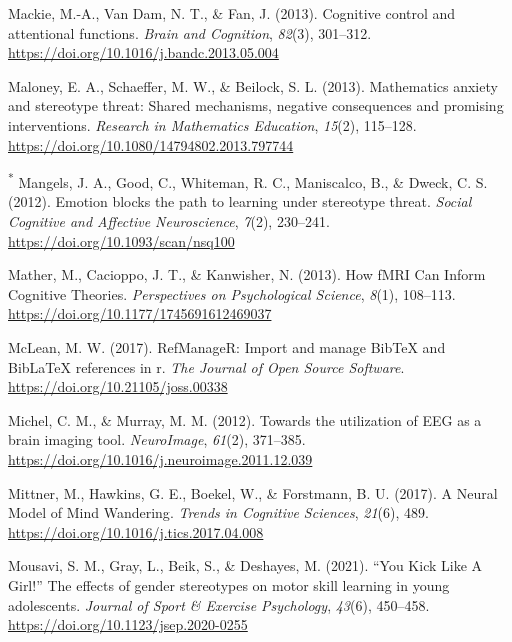 \documentclass[
  stu, a4paper,floatsintext]{apa7}
\newlength{\cslhangindent}
\newenvironment{CSLReferences}[2] %
 {\begin{list}{}{%
  \setlength{\itemindent}{0pt}
  \setlength{\leftmargin}{0pt}
  \setlength{\parsep}{0pt}
  \ifodd #1
   \setlength{\leftmargin}{\cslhangindent}
   \setlength{\itemindent}{-1\cslhangindent}
  \fi
  \setlength{\itemsep}{#2\baselineskip}}}
 {\end{list}}
\begin{document}
\begin{CSLReferences}{1}{0}
Mackie, M.-A., Van Dam, N. T., \& Fan, J. (2013). Cognitive control and attentional functions. \emph{Brain and Cognition}, \emph{82}(3), 301--312. \url{https://doi.org/10.1016/j.bandc.2013.05.004}

Maloney, E. A., Schaeffer, M. W., \& Beilock, S. L. (2013). Mathematics anxiety and stereotype threat: Shared mechanisms, negative consequences and promising interventions. \emph{Research in Mathematics Education}, \emph{15}(2), 115--128. \url{https://doi.org/10.1080/14794802.2013.797744}

\textsuperscript{*} Mangels, J. A., Good, C., Whiteman, R. C., Maniscalco, B., \& Dweck, C. S. (2012). Emotion blocks the path to learning under stereotype threat. \emph{Social Cognitive and Affective Neuroscience}, \emph{7}(2), 230--241. \url{https://doi.org/10.1093/scan/nsq100}

Mather, M., Cacioppo, J. T., \& Kanwisher, N. (2013). How {fMRI Can Inform Cognitive Theories}. \emph{Perspectives on Psychological Science}, \emph{8}(1), 108--113. \url{https://doi.org/10.1177/1745691612469037}

McLean, M. W. (2017). RefManageR: Import and manage BibTeX and BibLaTeX references in r. \emph{The Journal of Open Source Software}. \url{https://doi.org/10.21105/joss.00338}

Michel, C. M., \& Murray, M. M. (2012). Towards the utilization of {EEG} as a brain imaging tool. \emph{NeuroImage}, \emph{61}(2), 371--385. \url{https://doi.org/10.1016/j.neuroimage.2011.12.039}

Mittner, M., Hawkins, G. E., Boekel, W., \& Forstmann, B. U. (2017). A {Neural Model} of {Mind Wandering}. \emph{Trends in Cognitive Sciences}, \emph{21}(6), 489. \url{https://doi.org/10.1016/j.tics.2017.04.008}

Mousavi, S. M., Gray, L., Beik, S., \& Deshayes, M. (2021). {``{You Kick Like A Girl}!''} The effects of gender stereotypes on motor skill learning in young adolescents. \emph{Journal of Sport \& Exercise Psychology}, \emph{43}(6), 450--458. \url{https://doi.org/10.1123/jsep.2020-0255}


\end{CSLReferences}
\end{document}
